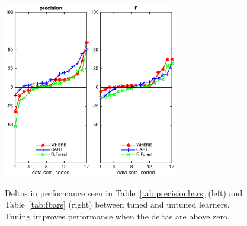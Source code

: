 \documentclass[smallextended]{svjour3}
\newcommand{\tab}[1]{Table~\ref{tab:#1}}
\begin{document}
\begin{figure}[!t]
\begin{center}
\includegraphics[width=1.5in]{./eps/improvements_precision.eps}\includegraphics[width=1.5in]{./eps/improvements_F.eps}
 \end{center}
\caption{Deltas in performance  seen in \tab{precisionbars} (left)
and \tab{fbars} (right) between tuned and untuned learners. Tuning improves performance when the deltas are above zero.}\label{fig:deltas}
 \end{figure}
 
\end{document}
